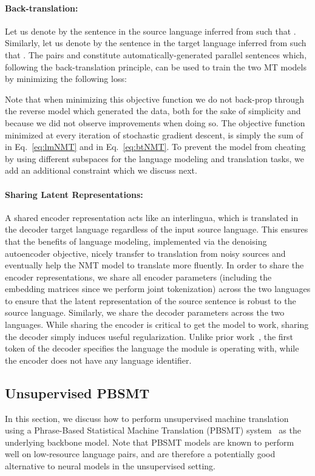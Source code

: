 \documentclass[11pt,a4paper]{article}
\begin{document}
\paragraph{Back-translation: }
Let us denote by  the sentence in the source language inferred from  such that . Similarly, let us denote by  the sentence in the target language inferred from  such that . The pairs  and  constitute automatically-generated parallel sentences which, following the back-translation principle, can be used to train the two MT models by minimizing the following loss:

Note that when minimizing this objective function we do not back-prop through the reverse model which generated the data, both for the sake of simplicity and because we did not observe improvements when doing so. 
The objective function minimized at every iteration of stochastic gradient descent, is simply the sum of  in Eq.~\ref{eq:lmNMT} and  in Eq.~\ref{eq:btNMT}. To prevent the model from cheating by using different subspaces for the language modeling and translation tasks, we add an additional constraint which we discuss next.

\paragraph{Sharing Latent Representations: } A shared encoder representation acts like an interlingua, which is translated in the decoder target language regardless of the input source language. This ensures that the benefits of language modeling, implemented via the denoising autoencoder objective, nicely transfer to translation from noisy sources and eventually help the NMT model to translate more fluently. In order to share the encoder representations, we share all encoder parameters (including the embedding matrices since we perform joint tokenization) across the two languages to ensure that the latent representation of the source sentence is robust to the source language. Similarly, we share the decoder parameters across the two languages. While sharing the encoder is critical to get the model to work, sharing the decoder simply induces useful regularization. Unlike prior work~\cite{gmt17}, the first token of the decoder specifies the language the module is operating with, while the encoder does not have any language identifier.

\subsection{Unsupervised PBSMT} \label{sec:pbsmt}
In this section, we discuss how to perform unsupervised machine translation using a Phrase-Based Statistical Machine Translation (PBSMT) system~\cite{pbsmt} as the underlying backbone model. Note that PBSMT models are known to perform well on low-resource language pairs, and are therefore a potentially good alternative to neural models in the unsupervised setting.
\end{document}

